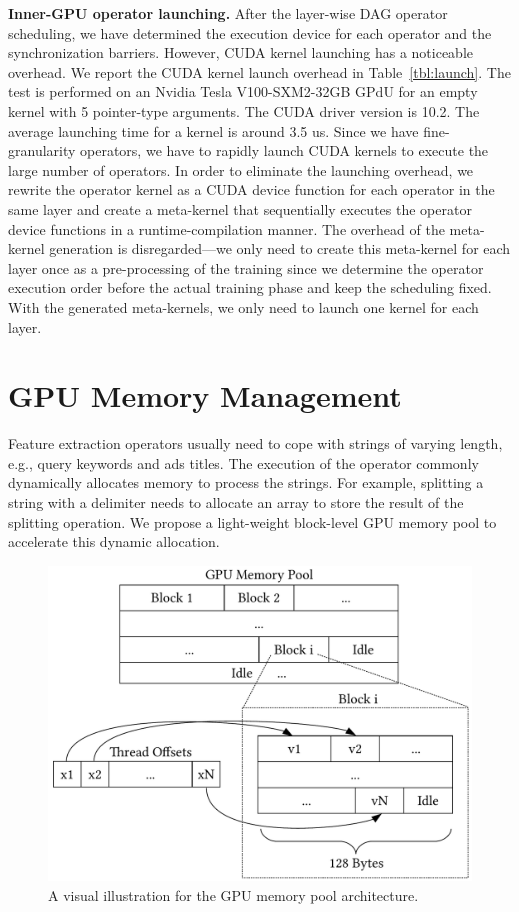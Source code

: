 \documentclass[sigconf]{acmart}
\begin{document}
\textbf{Inner-GPU operator launching.} 
After the layer-wise DAG operator scheduling, we have determined the execution device for each operator and the synchronization barriers. However, CUDA kernel launching has a noticeable overhead. 
We report the CUDA kernel launch overhead in Table~\ref{tbl:launch}. 
The test is performed on an Nvidia Tesla V100-SXM2-32GB GPdU for an empty kernel with 5 pointer-type arguments. The CUDA driver version is 10.2. The average launching time for a kernel is around 3.5 us. Since we have fine-granularity operators, we have to rapidly launch CUDA kernels to execute the large number of operators. In order to eliminate the launching overhead, we rewrite the operator kernel as a CUDA device function for each operator in the same layer and create a meta-kernel that sequentially executes the operator device functions in a runtime-compilation manner. The overhead of the meta-kernel generation is disregarded---we only need to create this meta-kernel for each layer once as a pre-processing of the training since we determine the operator execution order before the actual training phase and keep the scheduling fixed. 
With the generated meta-kernels, we only need to launch one kernel for each layer.


\section{GPU Memory Management}

Feature extraction operators usually need to cope with strings of varying length, e.g., query keywords and ads titles. The execution of the operator commonly dynamically allocates memory to process the strings. For example, splitting a string with a delimiter needs to allocate an array to store the result of the splitting operation. We propose a light-weight block-level GPU memory pool to accelerate this dynamic allocation. 

\begin{figure}[htbp]
\centering
\includegraphics[width=.5\textwidth]{figs/gpu_memory}
\caption{A visual illustration for the GPU memory pool architecture.}
\label{fig:memory}
\end{figure}
\end{document}
